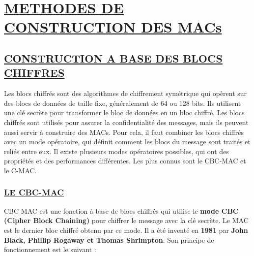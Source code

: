 \section{\textbf{\underline{METHODES DE CONSTRUCTION DES MACs}}}
\subsection{\textbf{\underline{CONSTRUCTION A BASE DES BLOCS CHIFFRES}}}

Les blocs chiffrés sont des algorithmes de chiffrement symétrique qui opèrent sur des blocs de données de taille fixe, généralement de 64 ou 128 bits. Ils utilisent une clé secrète pour transformer le bloc de données en un bloc chiffré. Les blocs chiffrés sont utilisés pour assurer la confidentialité des messages, mais ils peuvent aussi servir à construire des MACs. Pour cela, il faut combiner les blocs chiffrés avec un mode opératoire, qui définit comment les blocs du message sont traités et reliés entre eux. Il existe plusieurs modes opératoires possibles, qui ont des propriétés et des performances différentes. Les plus connus sont le CBC-MAC et le C-MAC.

\subsubsection{\textbf{\underline{LE CBC-MAC}}}

CBC MAC est une fonction à base de blocs chiffrés qui utilise le \textbf{mode CBC (Cipher Block Chaining)} pour chiffrer le message avec la clé secrète. Le MAC est le dernier bloc chiffré obtenu par ce mode. Il a été inventé en \textbf{1981} par \textbf{John Black, Phillip Rogaway et Thomas Shrimpton}. Son principe de fonctionnement est le suivant :

